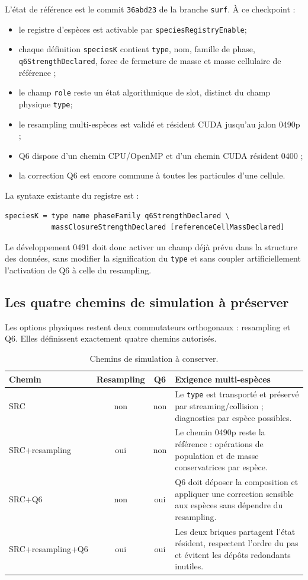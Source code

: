 \documentclass[11pt,a4paper]{article}
\newcommand{\code}[1]{\texttt{#1}}
\begin{document}
L'état de référence est le commit \code{36abd23} de la branche \code{surf}. À ce checkpoint :
\begin{itemize}
  \item le registre d'espèces est activable par \code{speciesRegistryEnable};
  \item chaque définition \code{speciesK} contient \code{type}, nom, famille de phase, \code{q6StrengthDeclared}, force de fermeture de masse et masse cellulaire de référence ;
  \item le champ \code{role} reste un état algorithmique de slot, distinct du champ physique \code{type};
  \item le resampling multi-espèces est validé et résident CUDA jusqu'au jalon 0490p ;
  \item Q6 dispose d'un chemin CPU/OpenMP et d'un chemin CUDA résident 0400 ;
  \item la correction Q6 est encore commune à toutes les particules d'une cellule.
\end{itemize}

La syntaxe existante du registre est :
\begin{lstlisting}
speciesK = type name phaseFamily q6StrengthDeclared \
           massClosureStrengthDeclared [referenceCellMassDeclared]
\end{lstlisting}

Le développement 0491 doit donc activer un champ déjà prévu dans la structure des données, sans modifier la signification du \code{type} et sans coupler artificiellement l'activation de Q6 à celle du resampling.

\subsection{Les quatre chemins de simulation à préserver}

Les options physiques restent deux commutateurs orthogonaux : resampling et Q6. Elles définissent exactement quatre chemins autorisés.

\begin{table}[H]
\centering
\caption{Chemins de simulation à conserver.}
\begin{tabularx}{\textwidth}{@{}lccX@{}}
\toprule
Chemin & Resampling & Q6 & Exigence multi-espèces \\
\midrule
SRC & non & non & Le \code{type} est transporté et préservé par streaming/collision ; diagnostics par espèce possibles. \\
SRC+resampling & oui & non & Le chemin 0490p reste la référence : opérations de population et de masse conservatrices par espèce. \\
SRC+Q6 & non & oui & Q6 doit déposer la composition et appliquer une correction sensible aux espèces sans dépendre du resampling. \\
SRC+resampling+Q6 & oui & oui & Les deux briques partagent l'état résident, respectent l'ordre du pas et évitent les dépôts redondants inutiles. \\
\bottomrule
\end{tabularx}
\end{table}
\end{document}
